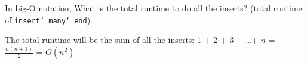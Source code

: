 \documentclass{exam}
\begin{document}
\begin{questions}
\begin{blocksection}
\begin{parts}
\begin{subparts}
\subpart In big-O notation, What is the total runtime to do all the inserts?
(total runtime of \texttt{insert\char`_many\char`_end})
\begin{solution}[0.25in]
The total runtime will be the sum of all the inserts: 1 + 2 + 3 + \ldots + $n$ =
$\frac{n (n + 1)}{2}$ = $O(n^{2})$
\end{solution}

\end{subparts}

\end{parts}
\end{blocksection}

\end{questions}

\end{document}
